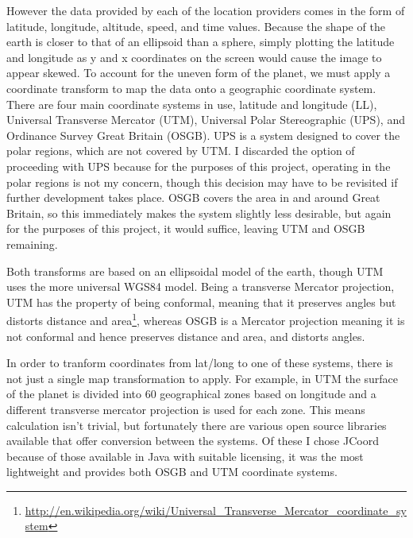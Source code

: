 However the data provided by each of the location providers comes in the form of latitude, longitude, altitude, speed, and time values. Because the shape of the earth is closer to that of an ellipsoid than a sphere, simply plotting the latitude and longitude as y and x coordinates on the screen would cause the image to appear skewed. To account for the uneven form of the planet, we must apply a coordinate transform to map the data onto a geographic coordinate system. There are four main coordinate systems in use, latitude and longitude (LL), Universal Transverse Mercator (UTM), Universal Polar Stereographic (UPS), and Ordinance Survey Great Britain (OSGB). UPS is a system designed to cover the polar regions, which are not covered by UTM. I discarded the option of proceeding with UPS because for the purposes of this project, operating in the polar regions is not my concern, though this decision may have to be revisited if further development takes place. OSGB covers the area in and around Great Britain, so this immediately makes the system slightly less desirable, but again for the purposes of this project, it would suffice, leaving UTM and OSGB remaining.

Both transforms are based on an ellipsoidal model of the earth, though UTM uses the more universal WGS84 model. Being a transverse Mercator projection, UTM has the property of being conformal, meaning that it preserves angles but distorts distance and area\footnote{\url{http://en.wikipedia.org/wiki/Universal_Transverse_Mercator_coordinate_system}}, whereas OSGB is a Mercator projection meaning it is not conformal and hence preserves distance and area, and distorts angles.

In order to tranform coordinates from lat/long to one of these systems, there is not just a single map transformation to apply. For example, in UTM the surface of the planet is divided into 60 geographical zones based on longitude and a different transverse mercator projection is used for each zone. This means calculation isn't trivial, but fortunately there are various open source libraries available that offer conversion between the systems. Of these I chose JCoord because of those available in Java with suitable licensing, it was the most lightweight and provides both OSGB and UTM coordinate systems.


